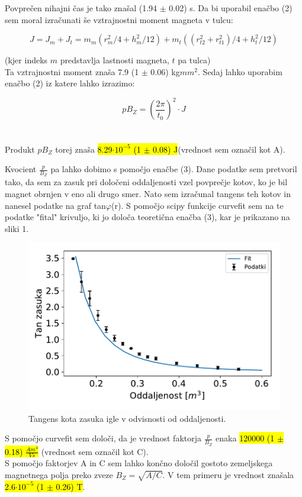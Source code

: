 \documentclass[12pt,a4paper]{article}
\begin{document}
Povpre\v cen nihajni \v cas je tako zna\v sal (1.94 $\pm$ 0.02) s. Da bi uporabil ena\v cbo (2) sem moral izra\v cunati \v se vztrajnostni moment magneta v tulcu:

$$J = J_m + J_t = m_m (r_m^2 / 4 + h_m^2 / 12) + m_t ((r^2_{t2} + r^2_{t1}) / 4 + h^2_t / 12)$$

(kjer indeks $m$ predstavlja lastnosti magneta, $t$ pa tulca)
\\
Ta vztrajnostni moment zna\v sa 7.9 (1 $\pm$ 0.06) kg$mm^{2}$. Sedaj lahko uporabim ena\v cbo (2) iz katere lahko izrazimo:

$$p B_{Z} = (\frac{2 \pi}{t_0})^2 \cdot J $$
\\
\\
Produkt  $p B_{Z}$ torej zna\v sa \hl{8.29$\cdot 10^{-5}$ (1 $\pm$ 0.08) J}(vrednost sem ozna\v cil kot A).

\newpage
Kvocient $\frac{p}{B_{Z}}$ pa lahko dobimo s pomo\v cjo ena\v cbe (3). Dane podatke sem pretvoril tako, da sem za zasuk pri dolo\v ceni oddaljenosti vzel povpre\v cje kotov, ko je bil magnet obrnjen v eno ali drugo smer. Nato sem izra\v cunal tangens teh kotov in nanesel podatke na graf tan$\varphi$(r). S pomo\v cjo scipy funkcije curvefit sem na te podatke "fital" krivuljo, ki jo dolo\v ca teoreti\v cna ena\v cba (3), kar je prikazano na sliki 1.

\begin{figure}[h]
	\includegraphics[width=12cm]{gauss.pdf}
	\centering
	\caption{Tangens kota zasuka igle v odvisnosti od oddaljenosti.}
\end{figure} 

S pomo\v cjo curvefit sem dolo\v ci, da je vrednost faktorja $\frac{p}{B_{Z}}$ enaka \hl{120000 (1 $\pm$ 0.18) $\frac{A m^4}{V s}$} (vrednost sem ozna\v cil kot C).
\\
S pomo\v cjo faktorjev A in C sem lahko kon\v cno dolo\v cil gostoto zemeljskega magnetnega polja preko zveze $B_{Z} = \sqrt{A / C}$. V tem primeru je vrednost zna\v sala \hl{2.6$\cdot 10^{-5}$ (1 $\pm$ 0.26) T}.
\end{document}
